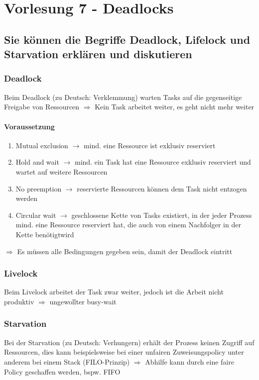 \documentclass{report}
\theoremstyle{definition}
\theoremstyle{example}
\begin{document}
\chapter{Vorlesung 7 - Deadlocks}

\section{Sie können die Begriffe Deadlock, Lifelock und Starvation erklären und diskutieren}
	\subsection{Deadlock}
Beim Deadlock (zu Deutsch: Verklemmung) warten Tasks auf die gegenseitige Freigabe von Ressourcen $\Rightarrow$ Kein Task arbeitet weiter, es geht nicht mehr weiter
		\subsubsection{Voraussetzung}
\begin{enumerate}
	\item Mutual exclusion $\rightarrow$ mind. eine Ressource ist exklusiv reserviert
	\item Hold and wait $\rightarrow$ mind. ein Task hat eine Ressource exklusiv reserviert und wartet auf weitere Ressourcen
	\item No preemption $\rightarrow$ reservierte Ressourcen können dem Task nicht entzogen werden 
	\item Circular wait $\rightarrow$ geschlossene Kette von Tasks existiert, in der jeder Prozess mind. eine Ressource reserviert hat, die auch von einem Nachfolger in der Kette benötigtwird
\end{enumerate}
$\Rightarrow$ Es müssen alle Bedingungen gegeben sein, damit der Deadlock eintritt

	\subsection{Livelock}
Beim Livelock arbeitet der Task zwar weiter, jedoch ist die Arbeit nicht produktiv $\Rightarrow$ ungewollter busy-wait

	\subsection{Starvation}
Bei der Starvation (zu Deutsch: Verhungern) erhält der Prozess keinen Zugriff auf Ressourcen, dies kann beispielsweise bei einer unfairen Zuweisungspolicy unter anderem bei einem Stack (FILO-Prinzip) $\Rightarrow$ Abhilfe kann durch eine faire Policy geschaffen werden, bspw. FIFO
\end{document}
